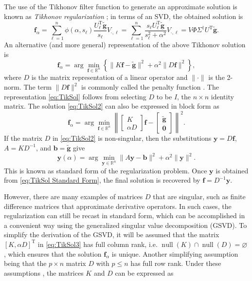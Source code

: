 \documentclass[12pt,notitlepage]{report}
\newcommand{\gnoiseVec}{\widetilde{\mathbf{g}}}	%
\newcommand{\kMat}{K}	%
\newcommand{\fVec}{\mathbf{f}}	%
\newcommand{\trans}{\mathrm{T}}	%
\DeclareMathOperator{\nullspace}{null}	%
\newcommand{\regparam}{\alpha}
\newcommand{\filt}{\phi}
\newcommand{\singular}{s}	%
\begin{document}
The use of the Tikhonov filter function to generate an approximate solution is known as \textit{Tikhonov regularization} \cite{Tikh1963}; in terms of an SVD, the obtained solution is
\begin{equation}
\fVec_\regparam = \sum_{\ell = 1}^n \filt(\regparam,\singular_\ell)\frac{{U^\trans_\ell}\gnoiseVec}{\singular_\ell}V_{\cdot,\ell} = \sum_{\ell = 1}^n \frac{\singular_\ell{U^\trans_\ell}\gnoiseVec}{\singular_\ell^2 + \regparam^2}V_{\cdot,\ell} = V\Phi\Sigma^\dagger U^\trans\gnoiseVec.
\label{eq:TikSol}
\end{equation}
An alternative (and more general) representation of the above Tikhonov solution is
\begin{equation}
\fVec_\regparam = \arg\min_{\fVec \in \mathbb{R}^n} \left\{\|\kMat\fVec - \gnoiseVec\|^2 + \regparam^2\|D\fVec\|^2\right\},
\label{eq:TikSol2}
\end{equation}
where $D$ is the matrix representation of a linear operator and $\|\cdot\|$ is the 2-norm. The term $\|D\fVec\|^2$ is commonly called the penalty function \cite{Vogel:2002}. The representation \eqref{eq:TikSol} follows from selecting $D$ to be $I$, the $n \times n$ identity matrix. The solution \eqref{eq:TikSol2} can also be expressed in block form as
\begin{equation}
\fVec_\regparam = \arg\min_{\fVec \in \mathbb{R}^n} \left\| \begin{bmatrix}
\kMat \\
\regparam D
\end{bmatrix}\fVec - \begin{bmatrix}
\gnoiseVec \\
\bm{0}
\end{bmatrix} \right\|^2.
\label{eq:TikSol3}
\end{equation}
If the matrix $D$ in \eqref{eq:TikSol2} is non-singular, then the substitutions $\mathbf{y} = D\fVec$, $A = \kMat{D}^{-1}$, and $\mathbf{b} = \gnoiseVec$ give
\begin{equation}
\mathbf{y}(\regparam) = \arg\min_{\mathbf{y} \in \mathbb{R}^n} \|A\mathbf{y} - \mathbf{b}\|^2 + \regparam^2\|\mathbf{y}\|^2.
\label{eq:TikSol Standard Form}
\end{equation}
This is known as standard form of the regularization problem. Once $\mathbf{y}$ is obtained from \eqref{eq:TikSol Standard Form}, the final solution is recovered by $\fVec = D^{-1}\mathbf{y}$.  \par 
However, there are many examples of matrices $D$ that are singular, such as finite difference matrices that approximate derivative operators. In such cases, the regularization can still be recast in standard form, which can be accomplished in a convenient way using the generalized singular value decomposition (GSVD). To simplify the derivation of the GSVD, it will be assumed that the matrix $[\kMat, \regparam D]^\trans$ in \eqref{eq:TikSol3} has full column rank, i.e. $\nullspace(\kMat) \cap \nullspace(D) = \varnothing$, which ensures that the solution $\fVec_\regparam$ is unique. Another simplifying assumption being that the $p \times n$ matrix $D$ with $p \leq n$ has full row rank. Under these assumptions \cite[p.~104]{ABT}, the matrices $\kMat$ and $D$ can be expressed as
\end{document}
